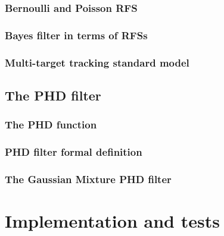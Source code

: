 \documentclass[english,master,unicode]{ctufit-thesis}
\theoremstyle{plain}
\theoremstyle{definition}
\theoremstyle{remark}
\numberwithin{theorem}{chapter}
\begin{document}
        \subsection{Bernoulli and Poisson RFS}\label{sec:bernoulli-poisson-rfs}
            
        \subsection{Bayes filter in terms of RFSs}\label{sec:bayes-filter-rfs}
            
        \subsection{Multi-target tracking standard model}\label{sec:mtt-standard-model}
            
    \section{The PHD filter}\label{sec:phd-filter}
        
        \subsection{The PHD function}\label{sec:phd-function}
            
        \subsection{PHD filter formal definition}\label{sec:phd-filter-formal}
            
        \subsection{The Gaussian Mixture PHD filter}\label{sec:gm-phd}
            
        


\chapter{Implementation and tests}
\end{document}

